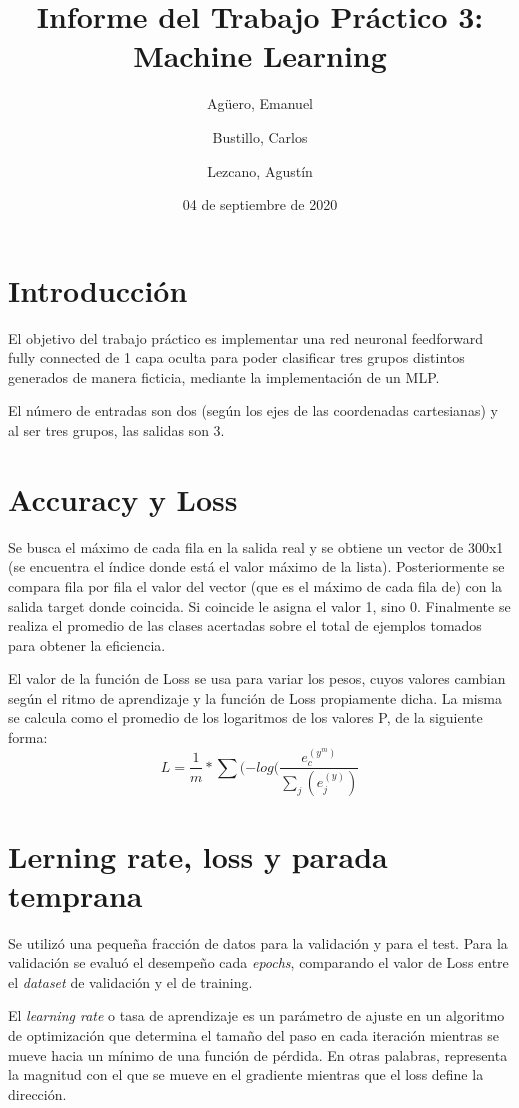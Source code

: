 \documentclass{article}
\title{Informe del Trabajo Práctico 3: Machine Learning}
\author{Agüero, Emanuel\\
\and
Bustillo, Carlos\\
\and
Lezcano, Agustín\\
}
\date{04 de septiembre de 2020}
\begin{document}
\maketitle

\section{Introducción}

El objetivo del trabajo práctico es implementar una  red neuronal feedforward fully connected de 1 capa oculta
para poder clasificar tres grupos distintos generados de manera ficticia, mediante la implementación de un MLP. 

El número de entradas son dos (según los ejes de las coordenadas cartesianas) y al ser tres grupos, las salidas son  3.

\section{Accuracy y Loss}
Se busca el máximo de cada fila en la salida real y  se obtiene un vector de 300x1 (se encuentra el índice donde está el valor máximo de la lista). Posteriormente se compara fila por fila el valor del vector (que es el máximo de cada fila de) con la salida target donde coincida. Si coincide le asigna el valor 1, sino 0. Finalmente se realiza el promedio de las clases acertadas sobre el total de ejemplos tomados para obtener la eficiencia.

El valor de la función de Loss se usa para variar los pesos, cuyos valores cambian según el ritmo de aprendizaje y la función de Loss propiamente dicha. La misma se calcula como el promedio de los logaritmos de los valores P, de la siguiente forma:
\begin{equation}
    L = \frac{1}{m}*\sum(-log(\frac{e^(y^m)_{c}}{\sum_{j}(e^(y)_{j})} 
\end{equation}


\section{Lerning rate, loss y parada temprana}
Se utilizó una pequeña fracción de datos para la validación y para el test. Para la validación se evaluó el desempeño cada   \textit{epochs}, comparando el valor de Loss entre el \textit{dataset} de validación y el de training. 

El \textit{learning rate} o tasa de aprendizaje es un parámetro de ajuste en un algoritmo de optimización que determina el tamaño del paso en cada iteración mientras se mueve hacia un mínimo de una función de pérdida. En otras palabras, representa la magnitud con el que se mueve en el gradiente mientras que el loss define la dirección.
\end{document}
